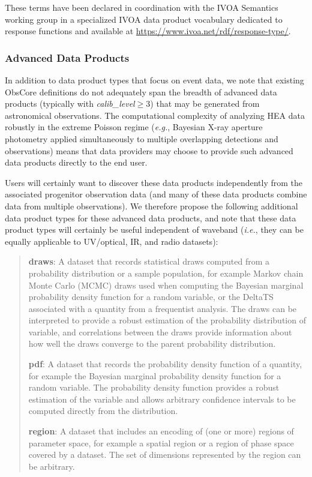 \documentclass[11pt,a4paper]{ivoa}
\begin{document}
These terms have been declared in coordination with the IVOA Semantics working group in a specialized IVOA data product vocabulary dedicated to response functions and available at \url{https://www.ivoa.net/rdf/response-type/}.

\subsubsection{Advanced Data Products}

In addition to data product types that focus on event data, we note that existing ObsCore definitions do not adequately span the breadth of advanced data products (typically with {\em calib\_level\/}${}\ge 3$) that may be generated from astronomical observations. The computational complexity of analyzing \gls{HEA} data robustly in the extreme Poisson regime ({\em e.g.\/}, Bayesian X-ray aperture photometry applied simultaneously to multiple overlapping detections and observations) means that data providers may choose to provide such advanced data products directly to the end user.

Users will certainly want to discover these data products independently from the associated progenitor observation data (and many of these data products combine data from multiple observations). We therefore propose the following additional data product types for these advanced data products, and note that these data product types will certainly be useful independent of waveband ({\em i.e.\/}, they can be equally applicable to UV/optical, IR, and radio datasets):

\begin{quote}
  {\bf draws}:  A dataset that records statistical draws computed from a probability distribution or a sample population, for example Markov chain Monte Carlo (MCMC) draws used when computing the Bayesian marginal probability density function for a random variable, or the DeltaTS associated with a quantity from a frequentist analysis.  The draws can be interpreted to provide a robust estimation of the probability distribution of variable, and correlations between the draws provide information about how well the draws converge to the parent probability distribution.

{\bf pdf}: A dataset that records the probability density function of a quantity, for example the Bayesian marginal probability density function for a random variable.  The probability density function provides a robust estimation of the variable and allows arbitrary confidence intervals to be computed directly from the distribution.

{\bf region}: A dataset that includes an encoding of (one or more) regions of parameter space, for example a spatial region or a region of phase space covered by a dataset.  The set of dimensions represented by the region can be arbitrary.
\end{quote}
\end{document}
